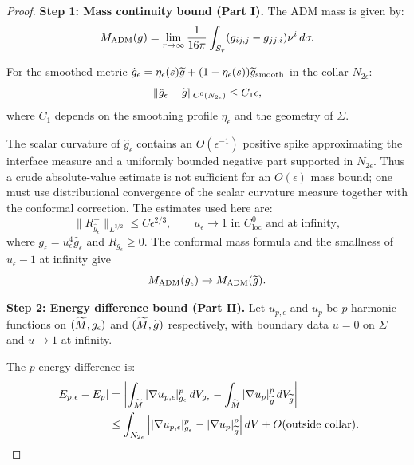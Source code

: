 \begin{proof}
\textbf{Step 1: Mass continuity bound (Part I).}
The ADM mass is given by:
\begin{equation}\label{eq:ADMMass}
    M_{\mathrm{ADM}}(g) = \lim_{r \to \infty} \frac{1}{16\pi} \int_{S_r} (g_{ij,j} - g_{jj,i}) \nu^i \, d\sigma.
\end{equation}

For the smoothed metric $\hat{g}_\epsilon = \eta_\epsilon(s) \widetilde{g} + (1 - \eta_\epsilon(s)) \widetilde{g}_{\text{smooth}}$ in the collar $N_{2\epsilon}$:
\begin{equation}\label{eq:MetricDiff}
    \|\hat{g}_\epsilon - \widetilde{g}\|_{C^0(N_{2\epsilon})} \le C_1 \epsilon,
\end{equation}
where $C_1$ depends on the smoothing profile $\eta_\epsilon$ and the geometry of $\Sigma$.

The scalar curvature of $\hat g_\epsilon$ contains an $O(\epsilon^{-1})$ positive spike approximating the interface measure and a uniformly bounded negative part supported in $N_{2\epsilon}$. Thus a crude absolute-value estimate is not sufficient for an $O(\epsilon)$ mass bound; one must use distributional convergence of the scalar curvature measure together with the conformal correction. The estimates used here are:
\begin{equation}\label{eq:CurvatureDiff}
    \|R^-_{\hat g_\epsilon}\|_{L^{3/2}} \le C\epsilon^{2/3},
    \qquad
    u_\epsilon \to 1 \text{ in } C^0_{\mathrm{loc}} \text{ and at infinity},
\end{equation}
where $g_\epsilon=u_\epsilon^4\hat g_\epsilon$ and $R_{g_\epsilon}\ge0$. The conformal mass formula and the smallness of $u_\epsilon-1$ at infinity give
\begin{equation}\label{eq:MassBound}
    M_{\mathrm{ADM}}(g_\epsilon) \to M_{\mathrm{ADM}}(\widetilde{g}).
\end{equation}

\textbf{Step 2: Energy difference bound (Part II).}
Let $u_{p,\epsilon}$ and $u_p$ be $p$-harmonic functions on $(\widetilde{M}, g_\epsilon)$ and $(\widetilde{M}, \widetilde{g})$ respectively, with boundary data $u = 0$ on $\Sigma$ and $u \to 1$ at infinity.

The $p$-energy difference is:
\begin{align}
    |E_{p,\epsilon} - E_p| &= \left| \int_{\widetilde{M}} |\nabla u_{p,\epsilon}|^p_{g_\epsilon} \, dV_{g_\epsilon} - \int_{\widetilde{M}} |\nabla u_p|^p_{\widetilde{g}} \, dV_{\widetilde{g}} \right| \nonumber\\
    &\le \int_{N_{2\epsilon}} \left| |\nabla u_{p,\epsilon}|^p_{g_\epsilon} - |\nabla u_p|^p_{\widetilde{g}} \right| dV + O(\text{outside collar}). \label{eq:EnergyDiff}
\end{align}


\end{proof}
